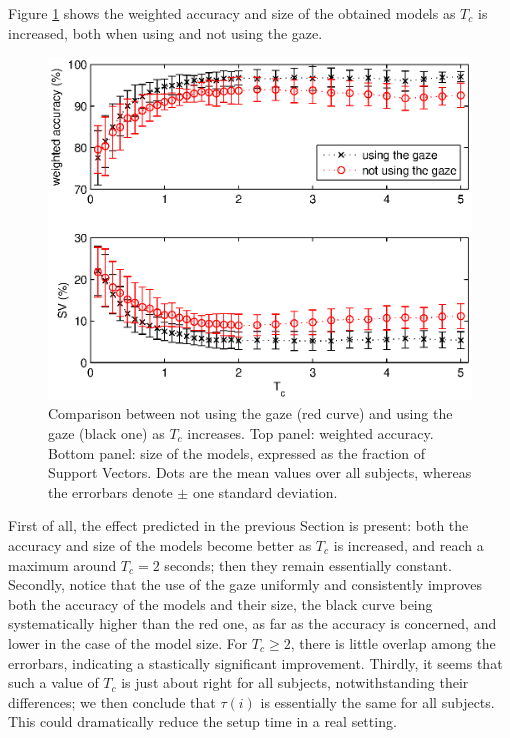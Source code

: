 \documentclass[jou,a4paper,notxfonts]{apa}
\begin{document}
Figure \ref{fig:comparison} shows the weighted accuracy and size of
the obtained models as $T_c$ is increased, both when using and not
using the gaze.

\begin{figure}[!ht]
  \centering
    \includegraphics[width=\linewidth]{figs/comparison.eps}
    \caption{Comparison between not using the gaze (red curve) and
    using the gaze (black one) as $T_c$ increases. Top panel: weighted
    accuracy. Bottom panel: size of the models, expressed as the
    fraction of Support Vectors. Dots are the mean values over all
    subjects, whereas the errorbars denote $\pm$ one standard deviation.}
    \label{fig:comparison}
\end{figure}

First of all, the effect predicted in the previous Section is present:
both the accuracy and size of the models become better as $T_c$ is
increased, and reach a maximum around $T_c=2$ seconds; then they
remain essentially constant. Secondly, notice that the use of the gaze
uniformly and consistently improves both the accuracy of the models
and their size, the black curve being systematically higher than the
red one, as far as the accuracy is concerned, and lower in the case of
the model size. For $T_c\geq 2$, there is little overlap among the
errorbars, indicating a stastically significant improvement. Thirdly,
it seems that such a value of $T_c$ is just about right for all
subjects, notwithstanding their differences; we then conclude that
$\tau(i)$ is essentially the same for all subjects. This could
dramatically reduce the setup time in a real setting.
\end{document}
